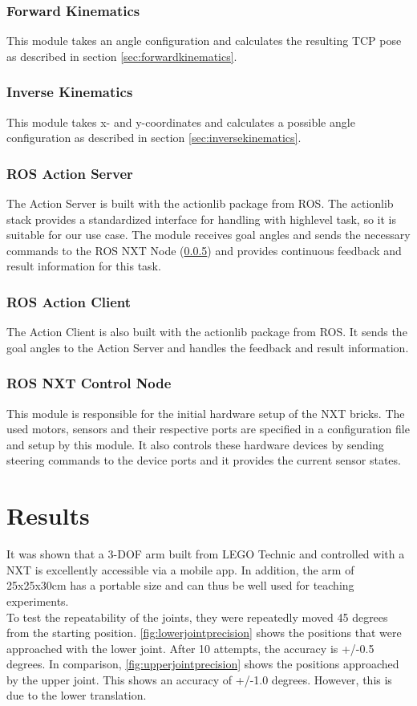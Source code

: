 \documentclass[conference]{IEEEtran}
\begin{document}
\subsubsection{Forward Kinematics}
This module takes an angle configuration and calculates the resulting TCP pose as described in section \ref{sec:forwardkinematics}.

\subsubsection{Inverse Kinematics}
This module takes x- and y-coordinates and calculates a possible angle configuration as described in section \ref{sec:inversekinematics}.

\subsubsection{ROS Action Server}\label{sec:actionserver}
The Action Server is built with the actionlib package from ROS\cite{onlRosActionLib}. The actionlib stack provides a standardized interface for handling with highlevel task, so it is suitable for our use case. The module receives goal angles and sends the necessary commands to the ROS NXT Node (\ref{sec:nxt_node}) and provides continuous feedback and result information for this task.

\subsubsection{ROS Action Client}\label{sec:actionclient}
The Action Client is also built with the actionlib package from ROS. It sends the goal angles to the Action Server and handles the feedback and result information. 

\subsubsection{ROS NXT Control Node}\label{sec:nxt_node}
This module is responsible for the initial hardware setup of the NXT bricks. The used motors, sensors and their respective ports are specified in a configuration file and setup by this module. It also controls these hardware devices by sending steering commands to the device ports and it provides the current sensor states.

\section{Results}
It was shown that a 3-DOF arm built from LEGO Technic and controlled with a NXT is excellently accessible via a mobile app. In addition, the arm of 25x25x30cm has a portable size and can thus be well used for teaching experiments.\\
To test the repeatability of the joints, they were repeatedly moved 45 degrees from the starting position. \autoref{fig:lowerjointprecision} shows the positions that were approached with the lower joint. After 10 attempts, the accuracy is +/-0.5 degrees. In comparison, \autoref{fig:upperjointprecision} shows the positions approached by the upper joint. This shows an accuracy of +/-1.0 degrees. However, this is due to the lower translation.
\end{document}
